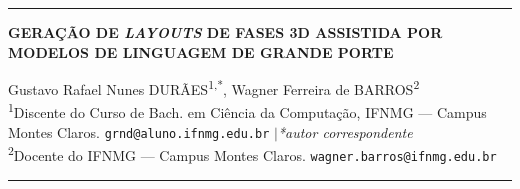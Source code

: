 \documentclass[
  12pt,
  a4paper,
  oneside,
  article,
  brazil
]{abntex2}
\begin{document}
\textual
{}
\pagestyle{fancy}
\thispagestyle{primeirapagina}
\OnehalfSpacing

\vspace{0.15cm}

\noindent\rule{\linewidth}{1pt}
\vspace{0.05cm}

\begin{center}
  {\large\bfseries
    GERAÇÃO DE \textit{LAYOUTS} DE FASES 3D ASSISTIDA POR MODELOS DE LINGUAGEM DE GRANDE PORTE
  }
\end{center}

\vspace{0.1cm}

\begin{center}
  \begin{SingleSpace}
    {\normalsize
      Gustavo Rafael Nunes DURÃES\textsuperscript{1,*},\;
      Wagner Ferreira de BARROS\textsuperscript{2}
    }\\[3pt]
    {\small
      \textsuperscript{1}Discente do Curso de Bach. em Ciência da Computação, IFNMG --- Campus Montes Claros.
      \texttt{grnd@aluno.ifnmg.edu.br}%
      \;$|$\;\textit{*autor correspondente}\\
      \textsuperscript{2}Docente do IFNMG --- Campus Montes Claros.
      \texttt{wagner.barros@ifnmg.edu.br}
    }
  \end{SingleSpace}
\end{center}

\vspace{0.2cm}
\noindent\rule{\linewidth}{0.4pt}
\vspace{0.05cm}
\end{document}
